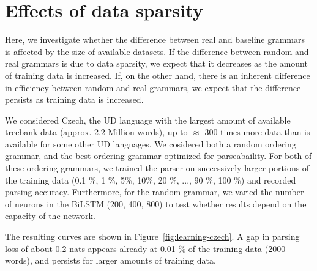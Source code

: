 \documentclass[10pt,twoside,lineno]{article}
\begin{document}
%

\section{Effects of data sparsity}

Here, we investigate whether the difference between real and baseline grammars is affected by the size of available datasets.
If the difference between random and real grammars is due to data sparsity, we expect that it decreases as the amount of training data is increased.
If, on the other hand, there is an inherent difference in efficiency between random and real grammars, we expect that the difference persists as training data is increased.

We considered Czech, the UD language with the largest amount of available treebank data (approx. 2.2 Million words), up to $\approx$ 300 times more data than is available for some other UD languages.
We cosidered both a random ordering grammar, and the best ordering grammar optimized for parseabaility.
For both of these ordering grammars, we trained the parser on successively larger portions of the training data (0.1 \%, 1 \%, 5\%, 10\%, 20 \%, ..., 90 \%, 100 \%) and recorded parsing accuracy.
Furthermore, for the random grammar, we varied the number of neurons in the BiLSTM (200, 400, 800) to test whether results depend on the capacity of the network.


The resulting curves are shown in Figure~\ref{fig:learning-czech}.
A gap in parsing loss of about 0.2 nats appears already at 0.01 \% of the training data (2000 words), and persists for larger amounts of training data.
\end{document}
